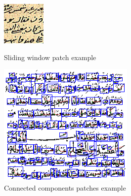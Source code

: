 \documentclass[conference]{IEEEtran}
\begin{document}
\begin{figure}[!t]
\centering
\begin{minipage}{.45\linewidth}
	\centering
  \includegraphics[height=.7\linewidth]{figures/3.png}
  \caption{Sliding window patch example}
  \label{fig:patches_example_sliding_window}
\end{minipage}
\hspace{.05\linewidth}
\begin{minipage}{.45\linewidth}
	\centering
  \includegraphics[height=.7\linewidth]{figures/patches_example_connected_components_part.png}
  \caption{Connected components patches example}
  \label{fig:patches_example_connected_components}
\end{minipage}
\end{figure}

\end{document}

